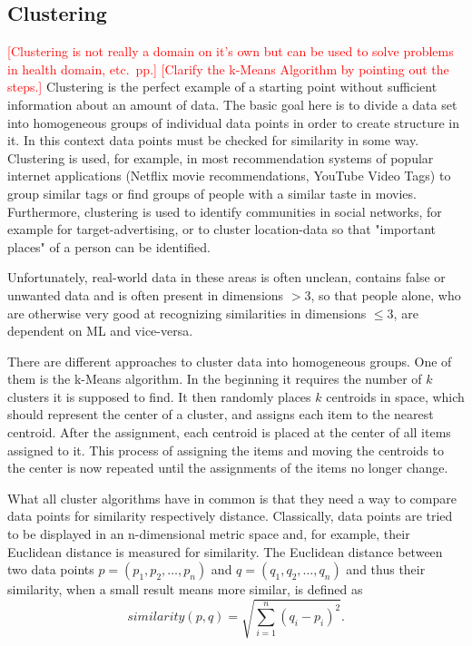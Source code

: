 \documentclass[conference]{IEEEtran}
\newcommand\notes[1]{\textcolor{red}{#1}}
\begin{document}
\subsection{Clustering}
\notes{[Clustering is not really a domain on it's own but can be used to solve problems in health domain, etc.\ pp.]}
\notes{[Clarify the k-Means Algorithm by pointing out the steps.]}
Clustering is the perfect example of a starting point without sufficient information about an amount of data. 
The basic goal here is to divide a data set into homogeneous groups of individual data points in order to create structure in it.
In this context data points must be checked for similarity in some way.
Clustering is used, for example, in most recommendation systems of popular internet applications (Netflix movie recommendations, YouTube Video Tags\cite{YouTube:pasca}) to group similar tags or find groups of people with a similar taste in movies.
Furthermore, clustering is used to identify communities in social networks, for example for target-advertising, or to cluster location-data so that "important places" of a person can be identified\cite{DJ:frankowski}.

Unfortunately, real-world data in these areas is often unclean, contains false or unwanted data and is often present in 
dimensions $>$3, so that people alone, who are otherwise very good at recognizing similarities in dimensions $\le3$, are dependent on ML and vice-versa.

There are different approaches to cluster data into homogeneous groups. One of them is the k-Means algorithm\cite{FoundationsOfML:mohri}. In the beginning it requires the number of $k$ clusters it is supposed to find. 
It then randomly places $k$ centroids in space, which should represent the center of a cluster, and assigns each item to the nearest centroid. After the assignment, each centroid is placed at the center of all items assigned to it. This process of assigning the items and moving the centroids to
the center is now repeated until the assignments of the items no longer change.

What all cluster algorithms have in common is that they need a way to compare data points for similarity respectively distance.
Classically, data points are tried to be displayed in an n-dimensional metric space and, for example, their Euclidean distance is measured for similarity.
The Euclidean distance between two data points $p = (p_1, p_2, \dots, p_n)$ and $q = (q_1, q_2, \dots, q_n)$ and thus their
similarity, when a small result means more similar, is defined as
\begin{equation*}
    similarity(p, q) = \sqrt{\sum_{i=1}^{n} (q_i - p_i)^{2}}.
\end{equation*}
\end{document}
